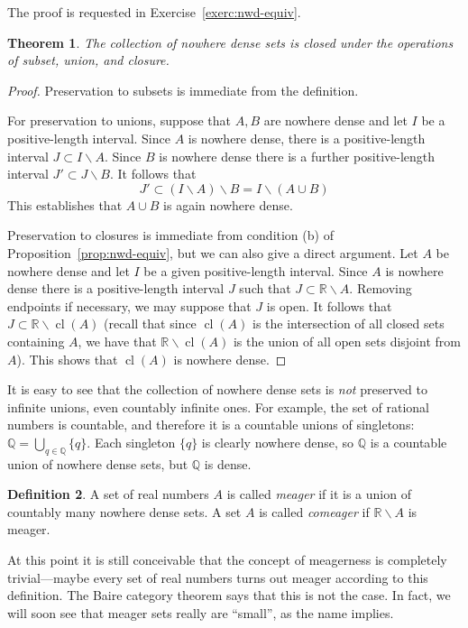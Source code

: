 \documentclass[11pt,oneside]{amsbook}
\newcommand{\Q}{\mathbb Q}
\newcommand{\R}{\mathbb R}
\DeclareMathOperator{\cl}{cl}
\theoremstyle{definition}
\theoremstyle{plain}
\newtheorem{theorem}{Theorem}[section]
\theoremstyle{definition}
\newtheorem{definition}[theorem]{Definition}
\theoremstyle{remark}
\numberwithin{equation}{section}
\numberwithin{figure}{section}
\begin{document}
The proof is requested in Exercise~\ref{exerc:nwd-equiv}.

\begin{theorem}
  The collection of nowhere dense sets is closed under the operations of subset, union, and closure.
\end{theorem}

\begin{proof}
  Preservation to subsets is immediate from the definition.

  For preservation to unions, suppose that $A,B$ are nowhere dense and let $I$ be a positive-length interval. Since $A$ is nowhere dense, there is a positive-length interval $J\subset I\smallsetminus A$. Since $B$ is nowhere dense there is a further positive-length interval $J'\subset J\smallsetminus B$. It follows that
  \[J'\subset (I\smallsetminus A)\smallsetminus B=I\smallsetminus (A\cup B)
  \]
  This establishes that $A\cup B$ is again nowhere dense.

  Preservation to closures is immediate from condition (b) of Proposition~\ref{prop:nwd-equiv}, but we can also give a direct argument. Let $A$ be nowhere dense and let $I$ be a given positive-length interval. Since $A$ is nowhere dense there is a positive-length interval $J$ such that $J\subset\R\smallsetminus A$. Removing endpoints if necessary, we may suppose that $J$ is open. It follows that $J\subset\R\smallsetminus\cl(A)$ (recall that since $\cl(A)$ is the intersection of all closed sets containing $A$, we have that $\R\smallsetminus\cl(A)$ is the union of all open sets disjoint from $A$). This shows that $\cl(A)$ is nowhere dense.
\end{proof}

It is easy to see that the collection of nowhere dense sets is \emph{not} preserved to infinite unions, even countably infinite ones. For example, the set of rational numbers is countable, and therefore it is a countable unions of singletons: $\Q=\bigcup_{q\in\Q}\{q\}$. Each singleton $\{q\}$ is clearly nowhere dense, so $\Q$ is a countable union of nowhere dense sets, but $\Q$ is dense.

\begin{definition}
  A set of real numbers $A$ is called \emph{meager} if it is a union of countably many nowhere dense sets. A set $A$ is called \emph{comeager} if $\R\smallsetminus A$ is meager.
\end{definition}

At this point it is still conceivable that the concept of meagerness is completely trivial---maybe every set of real numbers turns out meager according to this definition. The Baire category theorem says that this is not the case. In fact, we will soon see that meager sets really are ``small'', as the name implies.
\end{document}
